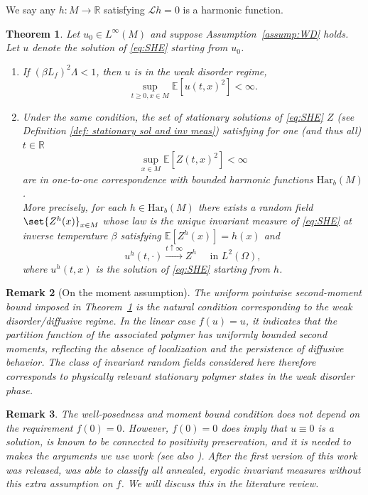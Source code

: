 \documentclass{article}
\newtheorem{theorem}{Theorem}
\newtheorem{remark}[theorem]{Remark}
\numberwithin{theorem}{section}
\def\text{\mbox}
\def\RR{\mathbb{R}} %
\def\EE{\mathbb{E}} %
\def\mc{\mathcal}
\begin{document}
\noindent We say any $h:M\to\RR$ satisfying $\mc{L}h=0$ is a harmonic function.
\begin{theorem}\label{thm:main}
Let $u_0\in L^\infty(M)$ and suppose Assumption~\ref{assump:WD} holds. Let $u$ denote the solution of \eqref{eq:SHE} starting from $u_0$.

\begin{enumerate}
\item[(i)] If $(\beta L_f)^2\Lambda<1$, then $u$ is in the weak disorder regime,
\[
\sup_{t\ge0,x\in M}\EE[u(t,x)^2]<\infty.
\]

\item[(ii)] Under the same condition, the set of stationary solutions of \eqref{eq:SHE} $Z$ (see Definition \ref{def: stationary sol and inv meas}) satisfying for one (and thus all) $t\in\RR$
\[
\sup_{x\in M}\EE[Z(t,x)^2]<\infty
\]
are in one-to-one correspondence with bounded harmonic functions $\mathrm{Har}_b(M)$.\\
More precisely, for each $h\in \mathrm{Har}_b(M)$ there exists a random field \(\set{Z^h(x)}_{x\in M}\) whose law is the unique invariant measure of \eqref{eq:SHE} at inverse temperature $\beta$ satisfying $\EE[Z^h(x)]=h(x)$ and \[u^h(t,\cdot)\stackrel{t\uparrow\infty}{\longrightarrow}Z^h\quad \text{ in }L^2(\Omega),\] where $u^h(t,x)$ is the solution of \eqref{eq:SHE} starting from $h$.
\end{enumerate}
\end{theorem}

\begin{remark}[On the moment assumption]
The uniform pointwise second-moment bound imposed in Theorem~\ref{thm:main} is the natural condition corresponding to the weak disorder/diffusive regime. In the linear case $f(u)=u$, it indicates that the partition function of the associated polymer has uniformly bounded second moments, reflecting the absence of localization and the persistence of diffusive behavior. The class of invariant random fields considered here therefore corresponds to physically relevant stationary polymer states in the weak disorder phase.
\end{remark}

\begin{remark}
    The well-posedness and moment bound condition does not depend on the requirement $f(0)=0$. However, $f(0)=0$ does imply that $u\equiv 0$ is a solution, is known to be connected to positivity preservation\cite{CH19}, and it is needed to makes the arguments we use work (see also \cite[Section 5]{COTX25}). After the first version of this work was released, \cite{JKKM26} was able to classify all annealed, ergodic invariant measures without this extra assumption on $f$. We will discuss this in the literature review.
\end{remark}
\end{document}

